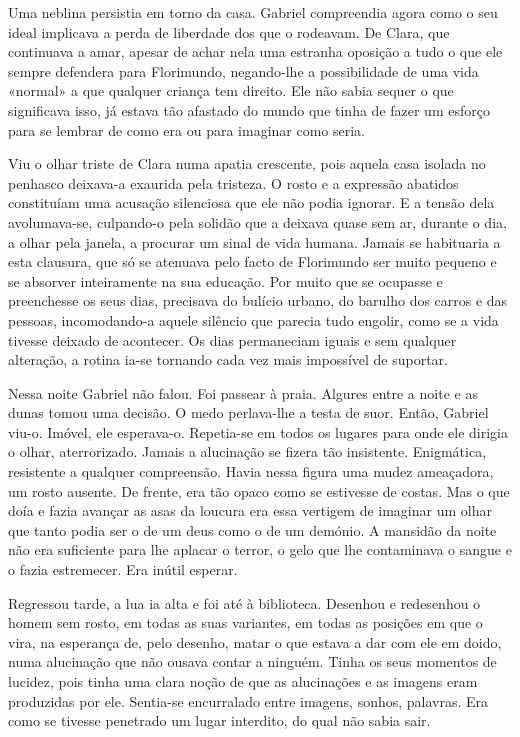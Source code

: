 Uma neblina persistia em torno da casa. Gabriel compreendia agora como o
seu ideal implicava a perda de liberdade dos que o rodeavam. De Clara,
que continuava a amar, apesar de achar nela uma estranha oposição a tudo
o que ele sempre defendera para Florimundo, negando-lhe a possibilidade
de uma vida «normal» a que qualquer criança tem direito. Ele não sabia
sequer o que significava isso, já estava tão afastado do mundo que tinha
de fazer um esforço para se lembrar de como era ou para imaginar como
seria.

Viu o olhar triste de Clara numa apatia crescente, pois aquela casa
isolada no penhasco deixava-a exaurida pela tristeza. O rosto e a
expressão abatidos constituíam uma acusação silenciosa que ele não podia
ignorar. E a tensão dela avolumava-se, culpando-o pela solidão que a
deixava quase sem ar, durante o dia, a olhar pela janela, a procurar um
sinal de vida humana. Jamais se habituaria a esta clausura, que só se
atenuava pelo facto de Florimundo ser muito pequeno e se absorver
inteiramente na sua educação. Por muito que se ocupasse e preenchesse os
seus dias, precisava do bulício urbano, do barulho dos carros e das
pessoas, incomodando-a aquele silêncio que parecia tudo engolir, como se
a vida tivesse deixado de acontecer. Os dias permaneciam iguais e sem
qualquer alteração, a rotina ia-se tornando cada vez mais impossível de
suportar.

Nessa noite Gabriel não falou. Foi passear à praia. Algures entre a
noite e as dunas tomou uma decisão. O medo perlava-lhe a testa de suor.
Então, Gabriel viu-o. Imóvel, ele esperava-o. Repetia-se em todos os
lugares para onde ele dirigia o olhar, aterrorizado. Jamais a alucinação
se fizera tão insistente. Enigmática, resistente a qualquer compreensão.
Havia nessa figura uma mudez ameaçadora, um rosto ausente. De frente,
era tão opaco como se estivesse de costas. Mas o que doía e fazia
avançar as asas da loucura era essa vertigem de imaginar um olhar que
tanto podia ser o de um deus como o de um demónio. A mansidão da noite
não era suficiente para lhe aplacar o terror, o gelo que lhe contaminava
o sangue e o fazia estremecer. Era inútil esperar.

Regressou tarde, a lua ia alta e foi até à biblioteca. Desenhou e
redesenhou o homem sem rosto, em todas as suas variantes, em todas as
posições em que o vira, na esperança de, pelo desenho, matar o que
estava a dar com ele em doido, numa alucinação que não ousava contar a
ninguém. Tinha os seus momentos de lucidez, pois tinha uma clara noção
de que as alucinações e as imagens eram produzidas por ele. Sentia-se
encurralado entre imagens, sonhos, palavras. Era como se tivesse
penetrado um lugar interdito, do qual não sabia sair.

